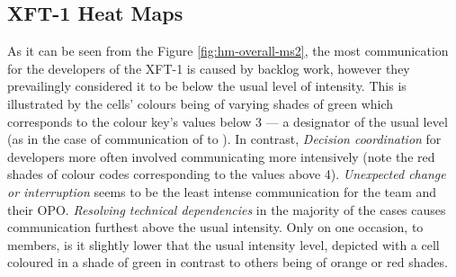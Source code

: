 \subsection{XFT-1 Heat Maps}
\label{sec:findings-xft1-hm}
As it can be seen from the Figure \ref{fig:hm-overall-ms2}, the most communication for the developers of the \ac{XFT}-1 is caused by backlog work, however they prevailingly considered it to be below the usual level of intensity. This is illustrated by the cells' colours being of varying shades of green which corresponds to the colour key's values below 3 --- a designator of the usual level (as in the case of communication of  to ). In contrast, \emph{Decision coordination} for developers more often involved communicating more intensively (note the red shades of colour codes corresponding to the values above 4). \emph{Unexpected change or interruption} seems to be the least intense communication for the team and their \ac{OPO}. \emph{Resolving technical dependencies} in the majority of the cases causes communication furthest above the usual intensity. Only on one occasion,  to  members, is it slightly lower that the usual intensity level, depicted with a cell coloured in a shade of green in contrast to others being of orange or red shades.

